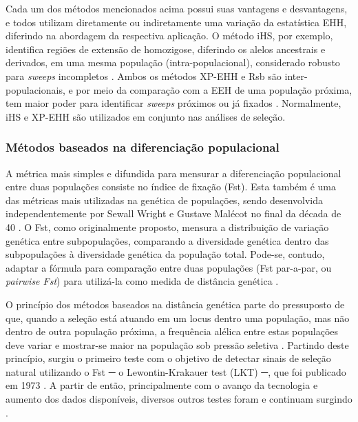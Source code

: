 Cada um dos métodos mencionados acima possui suas vantagens e desvantagens, e todos utilizam diretamente ou indiretamente uma variação da estatística EHH, diferindo na abordagem da respectiva aplicação. O método iHS, por exemplo, identifica regiões de extensão de homozigose, diferindo os alelos ancestrais e derivados, em uma mesma população (intra-populacional), considerado robusto para \textit{sweeps} incompletos \cite{vitti_detecting_2013}. Ambos os métodos XP-EHH e Rsb são inter-populacionais, e por meio da comparação com a EEH de uma população próxima, tem maior poder para identificar \textit{sweeps} próximos ou já fixados \cite{suzuki_statistical_2010}. Normalmente, iHS e XP-EHH são utilizados em conjunto nas análises de seleção.

\subsubsection{Métodos baseados na diferenciação populacional}

A métrica mais simples e difundida para mensurar a diferenciação populacional entre duas populações consiste no índice de fixação (Fst). Esta também é uma das métricas mais utilizadas na genética de populações, sendo desenvolvida independentemente por Sewall Wright e Gustave Malécot no final da década de 40 \cite{malecot_les_1948,wright_genetical_1949}. O Fst, como originalmente proposto, mensura a distribuição de variação genética entre subpopulações, comparando a diversidade genética dentro das subpopulações à diversidade genética da população total. Pode-se, contudo, adaptar a fórmula para comparação entre duas populações (Fst par-a-par, ou \textit{pairwise Fst}) para utilizá-la como medida de distância genética \cite{bhatia_estimating_2013,jobling_human_2014}.

O princípio dos métodos baseados na distância genética parte do pressuposto de que, quando a seleção está atuando em um locus dentro uma população, mas não dentro de outra população próxima, a frequência alélica entre estas populações deve variar e mostrar-se maior na população sob pressão seletiva \cite{vitti_detecting_2013}. Partindo deste princípio, surgiu o primeiro teste com o objetivo de detectar sinais de seleção natural utilizando o Fst ─ o Lewontin-Krakauer test (LKT) ─, que foi publicado em 1973 \cite{lewontin_distribution_1973}. A partir de então, principalmente com o avanço da tecnologia e aumento dos dados disponíveis, diversos outros testes foram e continuam surgindo \cite{rees_genomics_2020}.

